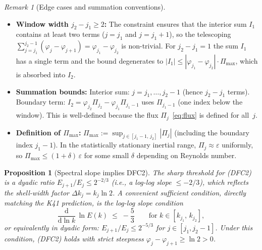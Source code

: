 \documentclass[12pt,a4paper]{article}
\theoremstyle{definition}
\theoremstyle{plain}
\newtheorem{proposition}[definition]{Proposition}
\theoremstyle{remark}
\newtheorem{remark}[definition]{Remark}
\begin{document}
\begin{remark}[Edge cases and summation conventions]
\label{rem:edge-cases}
\mbox{}
\begin{itemize}
  \item \textbf{Window width $j_2 - j_1 \ge 2$:}\;
    The constraint ensures that the interior sum $I_1$ contains at least
    two terms ($j = j_1$ and $j = j_1+1$), so the telescoping
    $\sum_{j=j_1}^{j_2-1}(\varphi_j - \varphi_{j+1}) =
    \varphi_{j_1} - \varphi_{j_2}$ is non-trivial. For $j_2 - j_1 = 1$
    the sum $I_1$ has a single term and the bound degenerates to
    $|I_1| \le |\varphi_{j_1}-\varphi_{j_2}|\cdot\Pi_{\max}$, which is
    absorbed into $I_2$.
  \item \textbf{Summation bounds:}\;
    Interior sum: $j = j_1, \ldots, j_2-1$ (hence $j_2-j_1$ terms).
    Boundary term: $I_2 = \varphi_{j_2}\Pi_{j_2} -
    \varphi_{j_1}\Pi_{j_1-1}$ uses $\Pi_{j_1-1}$ (one index below the
    window). This is well-defined because the flux
    $\Pi_j$~\eqref{eq:flux} is defined for all~$j$.
  \item \textbf{Definition of $\Pi_{\max}$:}\;
    $\Pi_{\max} := \sup_{j \in [j_1-1,\, j_2]} |\Pi_j|$ (including the
    boundary index $j_1-1$). In the statistically stationary inertial
    range, $\Pi_j \approx \varepsilon$ uniformly, so $\Pi_{\max} \le
    (1+\delta)\,\varepsilon$ for some small $\delta$ depending on
    Reynolds number.
\end{itemize}
\end{remark}

\begin{proposition}[Spectral slope implies DFC2]\label{prop:slope-DFC2}
The sharp threshold for \textup{(DFC2)} is a dyadic ratio
$E_{j+1}/E_j \le 2^{-2/3}$ (i.e., a log-log slope $\le -2/3$), which
reflects the shell-width factor $\Delta k_j = k_j \ln 2$.  A convenient
\emph{sufficient} condition, directly matching the K41 prediction, is the
\emph{log-log slope condition}
\begin{equation}\label{eq:slope-condition}
  \frac{\mathrm{d}}{\mathrm{d}\ln k}\,\ln E(k)
  \;\le\; -\frac{5}{3}
  \qquad \text{for } k \in [k_{j_1},\, k_{j_2}],
\end{equation}
or equivalently in dyadic form: $E_{j+1}/E_j \le 2^{-5/3}$ for
$j \in [j_1, j_2-1]$.  Under this condition, \textup{(DFC2)} holds
with strict steepness $\varphi_j - \varphi_{j+1} \ge \ln 2 > 0$.
\end{proposition}
\end{document}
